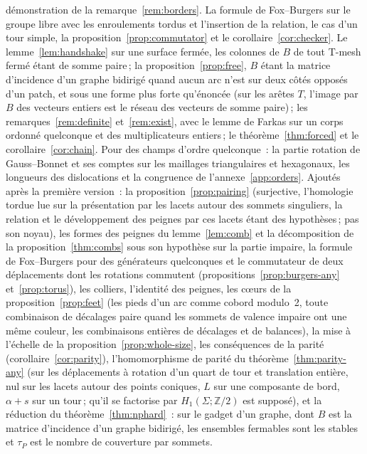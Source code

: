 \documentclass[11pt,a4paper]{article}
\newcommand{\Z}{\mathbb{Z}}
\begin{document}
démonstration de la remarque~\ref{rem:borders}. La formule de Fox--Burgers
sur le groupe libre avec les enroulements tordus et l'insertion de la
relation, le cas d'un tour simple, la proposition~\ref{prop:commutator} et le
corollaire~\ref{cor:checker}. Le lemme~\ref{lem:handshake} sur une surface
fermée, les colonnes de $B$ de tout T-mesh fermé étant de somme paire\,; la
proposition~\ref{prop:free}, $B$ étant la matrice d'incidence d'un graphe
bidirigé quand aucun arc n'est sur deux côtés opposés d'un patch, et sous une forme plus forte
qu'énoncée (sur les arêtes $T$, l'image par $B$ des vecteurs entiers est le
réseau des vecteurs de somme paire)\,; les remarques~\ref{rem:definite}
et~\ref{rem:exist}, avec le lemme de Farkas sur un corps ordonné quelconque et
des multiplicateurs entiers\,; le théorème~\ref{thm:forced} et le
corollaire~\ref{cor:chain}. Pour des champs d'ordre quelconque~: la partie
rotation de Gauss--Bonnet et ses comptes sur les maillages triangulaires et
hexagonaux, les longueurs des dislocations et la congruence de
l'annexe~\ref{app:orders}. Ajoutés après la première version~: la
proposition~\ref{prop:pairing} (surjective, l'homologie tordue lue sur la
présentation par les lacets autour des sommets singuliers, la relation et le
développement des peignes par ces lacets étant des hypothèses\,; pas son
noyau), les formes des peignes du lemme~\ref{lem:comb} et la décomposition de
la proposition~\ref{thm:combs} sous son hypothèse sur la partie impaire, la formule de
Fox--Burgers pour des générateurs quelconques et le commutateur de deux
déplacements dont les rotations commutent (propositions~\ref{prop:burgers-any}
et~\ref{prop:torus}), les colliers, l'identité des peignes, les cœurs de la proposition~\ref{prop:feet} (les pieds d'un arc comme cobord modulo~2, toute combinaison de décalages paire quand les sommets de valence impaire ont une même couleur, les combinaisons entières de décalages et de balances), la mise à l'échelle
de la proposition~\ref{prop:whole-size}, les conséquences de la parité
(corollaire~\ref{cor:parity}), l'homomorphisme de parité du
théorème~\ref{thm:parity-any} (sur les déplacements à rotation d'un quart de
tour et translation entière, nul sur les lacets autour des points coniques,
$L$ sur une composante de bord, $\alpha + s$ sur un tour\,; qu'il se
factorise par $H_1(\Sigma; \Z/2)$ est supposé), et la réduction du
théorème~\ref{thm:nphard}~: sur le gadget d'un graphe, dont $B$ est la
matrice d'incidence d'un graphe bidirigé, les ensembles fermables sont les
stables et $\tau_P$ est le nombre de couverture par sommets.
\end{document}
